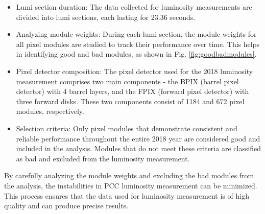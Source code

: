 \begin{itemize}

\item Lumi section duration: The data collected for luminosity measurements are divided into lumi sections, each lasting for 23.36 seconds.

\item Analyzing module weights: During each lumi section, the module weights for all pixel modules are studied to track their performance over time. This helps in identifying good and bad modules, as shown in Fig. \ref{fig:goodbadmodules}.

\item Pixel detector composition: The pixel detector used for the 2018 luminosity measurement comprises two main components - the BPIX (barrel pixel detector) with 4 barrel layers, and the FPIX (forward pixel detector) with three forward disks. These two components consist of 1184 and 672 pixel modules, respectively.

\item Selection criteria: Only pixel modules that demonstrate consistent and reliable performance throughout the entire 2018 year are considered good and included in the analysis. Modules that do not meet these criteria are classified as bad and excluded from the luminosity measurement.

\end{itemize}

By carefully analyzing the module weights and excluding the bad modules from the analysis, the instabilities in PCC luminosity measurement can be minimized. This process ensures that the data used for luminosity measurement is of high quality and can produce precise results.


